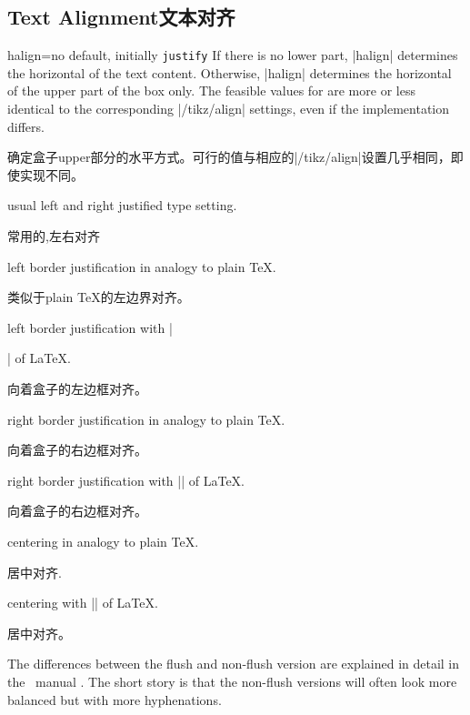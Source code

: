 \setcounter{section}{4}
\setcounter{subsection}{5}
\setcounter{subsubsection}{0}
 
\subsection{Text Alignment文本对齐}
\begin{docTcbKey}[][doc new=2015-05-07]{halign}{=}{no default, initially \texttt{justify}}
If there is no lower part, |halign| determines the horizontal 
of the text content.
Otherwise, |halign| determines the horizontal 
of the upper part of the box only.
The feasible values for  are more or less identical to
the corresponding |/tikz/align| settings, even if the implementation differs.

确定盒子upper部分的水平方式。可行的值与相应的|/tikz/align|设置几乎相同，即使实现不同。

\begin{DescriptionR}{}
\item[\docValue{justify}] usual left and right justified type setting.
\par 常用的,左右对齐%
\item[\docValue{left}]left border justification in analogy to plain \TeX.
\par 类似于plain \TeX 的左边界对齐。
\item[\docValue{flush left}]
left border justification with |\raggedright| of \LaTeX.
\par 向着盒子的左边框对齐。%
\item[\docValue{right}]right border justification in analogy to plain \TeX.
\par 向着盒子的右边框对齐。%
\item[\docValue{flush right}]right border justification with |\raggedleft| of \LaTeX.
\par 向着盒子的右边框对齐。%
\item[\docValue{center}]centering in analogy to plain \TeX.
\par 居中对齐.%
\item[\docValue{flush center}]centering with |\centering| of \LaTeX.
\par 居中对齐。%
\end{DescriptionR}
The differences between the flush and non-flush version are explained in
detail in the \tikzname\ manual \cite{tantau:tikz_and_pgf}. The short story is that
the non-flush versions will often look more balanced but with more
hyphenations.


\end{docTcbKey}
